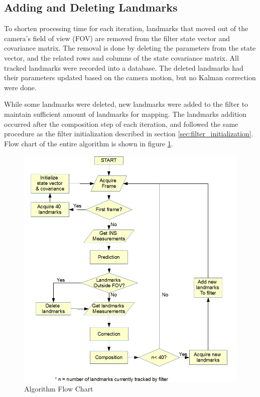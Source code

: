 \subsection{Adding and Deleting Landmarks}
To shorten processing time for each iteration, landmarks that moved
out of the camera's field of view (FOV) are removed from the filter
state vector and covariance matrix. The removal is done by deleting
the parameters from the state vector, and the related rows and columns
of the state covariance matrix. All tracked landmarks were recorded
into a database. The deleted landmarks had their parameters updated
based on the camera motion, but no Kalman correction were done.

While some landmarks were deleted, new landmarks were added to the
filter to maintain sufficient amount of landmarks for mapping. The
landmarks addition occurred after the composition step of each
iteration, and followed the same procedure as the filter
initialization described in section \ref{sec:filter_initialization}.
Flow chart of the entire algorithm is shown in figure
\ref{fig:flowchart}.

\begin{figure}[h]
\centering
\includegraphics[width=14cm, keepaspectratio=true]{./Figures/flow_chart.jpg}
\caption{Algorithm Flow Chart}
\label{fig:flowchart}
\end{figure}
\FloatBarrier

